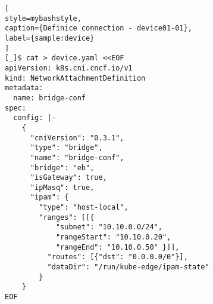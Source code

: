 \begin{lstfloat}
\begin{lstlisting}[
style=mybashstyle,
caption={Definice connection - device01-01},
label={sample:device}
]
[_]$ cat > device.yaml <<EOF
apiVersion: k8s.cni.cncf.io/v1
kind: NetworkAttachmentDefinition
metadata:
  name: bridge-conf
spec:
  config: |-
    {
      "cniVersion": "0.3.1",
      "type": "bridge",
      "name": "bridge-conf",
      "bridge": "eb",
      "isGateway": true,
      "ipMasq": true,
      "ipam": {
        "type": "host-local",
        "ranges": [[{
            "subnet": "10.10.0.0/24",
            "rangeStart": "10.10.0.20",
            "rangeEnd": "10.10.0.50" }]],
          "routes": [{"dst": "0.0.0.0/0"}],
          "dataDir": "/run/kube-edge/ipam-state"
        }
    }
EOF
\end{lstlisting}
\end{lstfloat}
